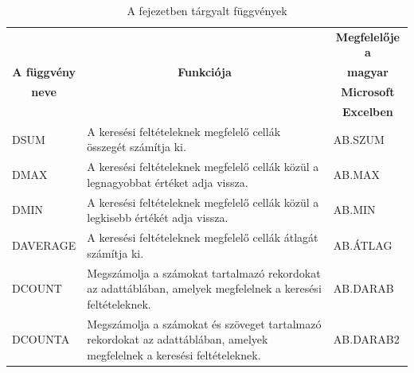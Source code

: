\begin{table}[!h]
\begin{center}
\caption{A fejezetben tárgyalt függvények}\label{13-fejezetFüggvények}
\begin{tabular}{|m{3cm}|m{8cm}|m{3cm}|}
\hline
 & & \multicolumn{1}{c|}{\textbf{Megfelelője a}} \\
\multicolumn{1}{|c|}{\textbf{A függvény}}&
\multicolumn{1}{c|}{\textbf{Funkciója}}&
\multicolumn{1}{c|}{\textbf{magyar}} \\
\multicolumn{1}{|c|}{\textbf{neve}} & &
\multicolumn{1}{c|}{\textbf{Microsoft}} \\
 & & \multicolumn{1}{c|}{\textbf{Excelben}} \\
\hline
DSUM & A keresési feltételeknek megfelelő cellák összegét
számítja ki. & AB.SZUM\\ \hline
DMAX & A keresési feltételeknek megfelelő cellák közül a
legnagyobbat értéket adja vissza. & AB.MAX\\ \hline
DMIN & A keresési feltételeknek megfelelő cellák közül a
legkisebb értékét adja vissza. & AB.MIN\\ \hline
DAVERAGE & A keresési feltételeknek megfelelő cellák átlagát
számítja ki. & AB.ÁTLAG\\ \hline
DCOUNT & Megszámolja a számokat tartalmazó rekordokat az adattáblában,
amelyek megfelelnek a keresési feltételeknek. & AB.DARAB\\ \hline
DCOUNTA & Megszámolja a számokat és szöveget tartalmazó rekordokat az
adattáblában, amelyek megfelelnek a keresési feltételeknek. &
AB.DARAB2\\ \hline
\end{tabular}
\end{center}
\end{table}

